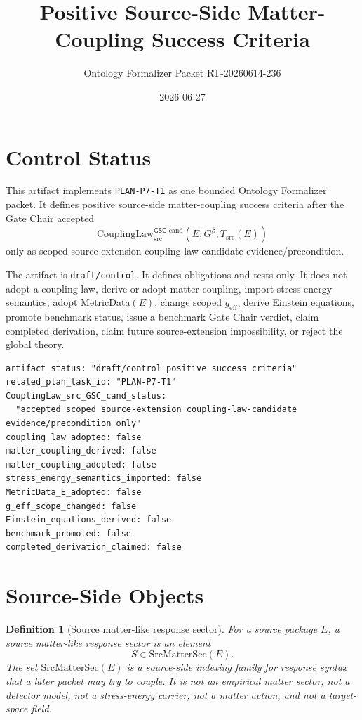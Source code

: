 \documentclass[11pt]{article}
\title{Positive Source-Side Matter-Coupling Success Criteria}
\author{Ontology Formalizer Packet RT-20260614-236}
\date{2026-06-27}
\newcommand{\Gbeta}{G^\beta}
\newcommand{\geff}{g_{\mathrm{eff}}}
\newcommand{\CouplingLaw}{\mathrm{CouplingLaw}^{\mathsf{GSC}\mbox{-}\mathrm{cand}}_{\mathrm{src}}}
\newcommand{\MetricData}{\mathrm{MetricData}}
\newcommand{\SrcMatterSec}{\mathrm{SrcMatterSec}}
\newtheorem{definition}{Definition}
\begin{document}
\maketitle

\section{Control Status}

This artifact implements \texttt{PLAN-P7-T1} as one bounded Ontology
Formalizer packet. It defines positive source-side matter-coupling success
criteria after the Gate Chair accepted
\[
  \CouplingLaw(E;\Gbeta,T_{\mathrm{src}}(E))
\]
only as scoped source-extension coupling-law-candidate evidence/precondition.

The artifact is \texttt{draft/control}. It defines obligations and tests only.
It does not adopt a coupling law, derive or adopt matter coupling, import
stress-energy semantics, adopt \(\MetricData(E)\), change scoped \(\geff\),
derive Einstein equations, promote benchmark status, issue a benchmark Gate
Chair verdict, claim completed derivation, claim future source-extension
impossibility, or reject the global theory.

\begin{verbatim}
artifact_status: "draft/control positive success criteria"
related_plan_task_id: "PLAN-P7-T1"
CouplingLaw_src_GSC_cand_status:
  "accepted scoped source-extension coupling-law-candidate evidence/precondition only"
coupling_law_adopted: false
matter_coupling_derived: false
matter_coupling_adopted: false
stress_energy_semantics_imported: false
MetricData_E_adopted: false
g_eff_scope_changed: false
Einstein_equations_derived: false
benchmark_promoted: false
completed_derivation_claimed: false
\end{verbatim}

\section{Source-Side Objects}

\begin{definition}[Source matter-like response sector]
For a source package \(E\), a source matter-like response sector is an element
\[
  S \in \SrcMatterSec(E).
\]
The set \(\SrcMatterSec(E)\) is a source-side indexing family for response
syntax that a later packet may try to couple. It is not an empirical matter
sector, not a detector model, not a stress-energy carrier, not a matter action,
and not a target-space field.
\end{definition}
\end{document}
